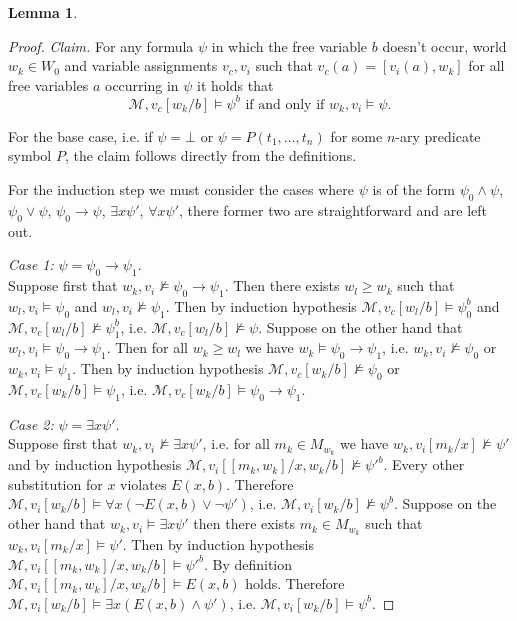 \documentclass{easychair}
\theoremstyle{definition}
\theoremstyle{definition}
\theoremstyle{definition}
\newtheorem{lemma}[theorem]{Lemma}
\theoremstyle{definition}
\theoremstyle{definition}
\theoremstyle{definition}
\theoremstyle{definition}
\begin{document}
\begin{lemma}
\begin{proof}
	\emph{Claim.} For any formula $\psi$ in which the free variable $b$ doesn't occur, world $w_k\in W_0$ and variable assignments $v_c, v_i$ such that $v_c(a) = [v_i(a), w_k]$ for all free variables $a$ occurring in $\psi$ it holds that
\[\mathcal M, v_c[w_k/b]\models \psi^b\text{ if and only if $w_k, v_i\models \psi$.}\]
	
	For the base case, i.e. if $\psi = \bot$ or $\psi = P(t_1,\dots, t_n)$ for some $n$-ary predicate symbol $P$, the claim follows directly from the definitions.
	
	For the induction step we must consider the cases where $\psi$ is of the form $\psi_0\wedge \psi$, $\psi_0\vee \psi$, $\psi_0\to \psi$, $\exists x\psi'$, $\forall x \psi'$, there former two are straightforward and are left out.

	\emph{Case 1:} $\psi = \psi_0\to \psi_1$.\\
	Suppose first that $w_k, v_i\not\models \psi_0\to\psi_1$. Then there exists $w_l\geq w_k$ such that $w_l, v_i\models \psi_0$ and $w_l, v_i\not\models\psi_1$. Then by induction hypothesis $\mathcal M, v_c[w_l/b]\models \psi_0^b$ and $\mathcal M, v_c[w_l/b]\not\models \psi_1^b$, i.e. $\mathcal M, v_c[w_l/b]\not\models \psi$. Suppose on the other hand that $w_l, v_i\models \psi_0\to\psi_1$. Then for all $w_k\geq w_l$ we have $w_k\models \psi_0\to \psi_1$, i.e. $w_k, v_i\not\models\psi_0$ or $w_k, v_i\models\psi_1$. Then by induction hypothesis $\mathcal M, v_c[w_k/b]\not\models\psi_0$ or $\mathcal M, v_c[w_k/b]\models\psi_1$, i.e. $\mathcal M, v_c[w_k/b]\models \psi_0\to\psi_1$.

	\emph{Case 2:} $\psi = \exists x\psi'$.\\
	Suppose first that $w_k, v_i\not\models\exists x\psi'$, i.e. for all $m_k\in M_{w_k}$ we have $w_k, v_i[m_k/x]\not\models \psi'$ and by induction hypothesis $\mathcal M, v_i[[m_k, w_k]/x, w_k/b]\not\models \psi'^b$. Every other substitution for $x$ violates $E(x, b)$. Therefore $\mathcal M, v_i[w_k/b]\models \forall x(\neg E(x, b)\vee \neg \psi')$, i.e. $\mathcal M, v_i[w_k/b]\not\models \psi^b$. Suppose on the other hand that $w_k, v_i\models \exists x\psi'$ then there exists $m_k\in M_{w_k}$ such that $w_k, v_i[m_k/x]\models\psi'$. Then by induction hypothesis $\mathcal M, v_i[[m_k, w_k]/x, w_k/b]\models \psi'^b$. By definition $\mathcal M, v_i[[m_k, w_k]/x, w_k/b]\models E(x, b)$ holds. Therefore $\mathcal M, v_i[w_k/b]\models \exists x(E(x, b)\wedge \psi')$, i.e. $\mathcal M, v_i[w_k/b]\models \psi^b$.


\end{proof}
\end{lemma}
\end{document}

